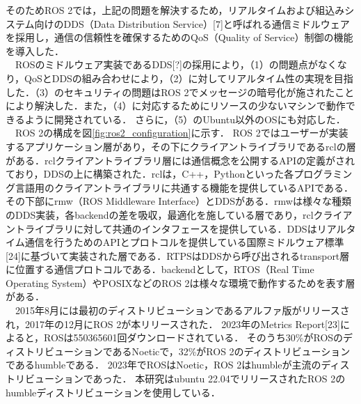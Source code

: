 そのためROS 2では，上記の問題を解決するため，リアルタイムおよび組込みシステム向けのDDS（Data Distribution Service）[7]と呼ばれる通信ミドルウェアを採用し，通信の信頼性を確保するためのQoS（Quality of Service）制御の機能を導入した．
\\　ROSのミドルウェア実装であるDDS[?]の採用により，（1）の問題点がなくなり，QoSとDDSの組み合わせにより，（2）に対してリアルタイム性の実現を目指した．（3）のセキュリティの問題はROS 2でメッセージの暗号化が施されたことにより解決した．また，（4）に対応するためにリソースの少ないマシンで動作できるように開発されている．
さらに，（5）のUbuntu以外のOSにも対応した．
\\　ROS 2の構成を図\ref{fig:ros2_configuration}に示す．
ROS 2ではユーザーが実装するアプリケーション層があり，その下にクライアントライブラリであるrclの層がある．rclクライアントライブラリ層には通信概念を公開するAPIの定義がされており，DDSの上に構築された．rclは，C++，Pythonといった各プログラミング言語用のクライアントライブラリに共通する機能を提供しているAPIである．その下部にrmw（ROS Middleware Interface）とDDSがある．rmwは様々な種類のDDS実装，各backendの差を吸収，最適化を施している層であり，rclクライアントライブラリに対して共通のインタフェースを提供している．DDSはリアルタイム通信を行うためのAPIとプロトコルを提供している国際ミドルウェア標準[24]に基づいて実装された層である．RTPSはDDSから呼び出されるtransport層に位置する通信プロトコルである．backendとして，RTOS（Real Time Operating System）やPOSIXなどのROS 2は様々な環境で動作するためを表す層がある．
\\　2015年8月には最初のディストリビューションであるアルファ版がリリースされ，2017年の12月にROS 2が本リリースされた．
2023年のMetrics Report[23]によると，ROSは550365601回ダウンロードされている．
そのうち30\%がROSのディストリビューションであるNoeticで，32\%がROS 2のディストリビューションであるhumbleである．
2023年でROSはNoetic，ROS 2はhumbleが主流のディストリビューションであった．
本研究はubuntu 22.04でリリースされたROS 2のhumbleディストリビューションを使用している．

